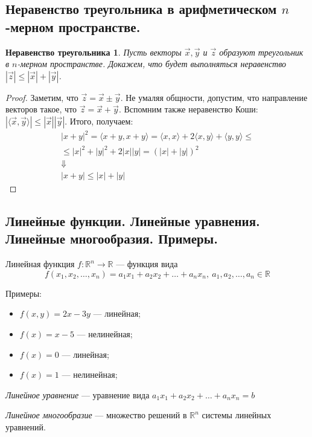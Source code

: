 \documentclass[a4paper, 12pt]{article}
\newtheorem*{triangle_inequality}{Неравенство треугольника}
\begin{document}
\subsection{Неравенство треугольника в арифметическом $n$-мерном пространстве.}
\begin{triangle_inequality}
Пусть векторы $\vec{x}, \vec{y}$ и $\vec{z}$ образуют треугольник в $n$-мерном пространстве. Докажем, что будет выполняться неравенство $|\vec{z}| \leqslant |\vec{x}| + |\vec{y}|$.
\end{triangle_inequality}
\begin{proof}
Заметим, что $\vec z = \vec{x} \pm \vec{y}$. Не умаляя общности, допустим, что направление векторов такое, что $\vec z = \vec x + \vec y$.  Вспомним также неравенство Коши: $|\langle \vec x, \vec y\rangle | \leqslant |\vec x||\vec y|$. Итого, получаем:
\begin{gather*}
|x + y|^2 = \langle x+y, x+y\rangle  = \langle x, x\rangle  + 2\langle x, y\rangle  + \langle y, y\rangle  \leqslant \\ \leqslant|x|^2 + |y|^2 + 2|x||y| = (|x| + |y|)^2 \\
\Downarrow \\
|x+y|\leqslant |x| + |y|
\end{gather*}
\end{proof}

\subsection{Линейные функции. Линейные уравнения. Линейные многообразия. Примеры.}
Линейная функция $f: \mathbb{R}^n \to \mathbb{R}$ — функция вида
\[f(x_1, x_2, \ldots, x_n)= a_1x_1 + a_2x_2 + \ldots + a_nx_n,\ a_1, a_2, \ldots, a_n \in \mathbb{R}\]

Примеры:
\begin{itemize}
    \item $f(x, y) = 2x-3y$ --- линейная;
    \item $f(x) = x - 5$ --- нелинейная;
    \item $f(x) = 0$ --- линейная;
    \item $f(x) = 1$ --- нелинейная;
\end{itemize}

\emph{Линейное уравнение} --- уравнение вида $a_1x_1 + a_2x_2 + \ldots + a_nx_n = b$

\emph{Линейное многообразие} --- множество решений в $\mathbb{R}^n$ системы линейных уравнений.
\end{document}
